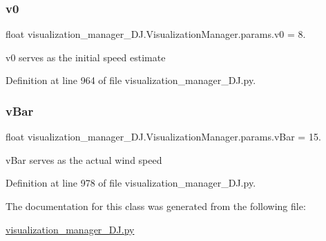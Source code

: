 \subsubsection{\texorpdfstring{v0}{v0}}
{\footnotesize\ttfamily float visualization\+\_\+manager\+\_\+\+D\+J.\+Visualization\+Manager.\+params.\+v0 = 8.\hspace{0.3cm}{\ttfamily [static]}}



v0 serves as the initial speed estimate 



Definition at line 964 of file visualization\+\_\+manager\+\_\+\+D\+J.\+py.

\mbox{\label{classvisualization__manager___d_j_1_1_visualization_manager_1_1params_a468678d5806ec035d997a40604e291f2}} 
\subsubsection{\texorpdfstring{v\+Bar}{vBar}}
{\footnotesize\ttfamily float visualization\+\_\+manager\+\_\+\+D\+J.\+Visualization\+Manager.\+params.\+v\+Bar = 15.\hspace{0.3cm}{\ttfamily [static]}}



v\+Bar serves as the \textquotesingle{}actual\textquotesingle{} wind speed 



Definition at line 978 of file visualization\+\_\+manager\+\_\+\+D\+J.\+py.



The documentation for this class was generated from the following file\+:\begin{DoxyCompactItemize}
\item 
\mbox{\hyperlink{visualization__manager___d_j_8py}{visualization\+\_\+manager\+\_\+\+D\+J.\+py}}\end{DoxyCompactItemize}

